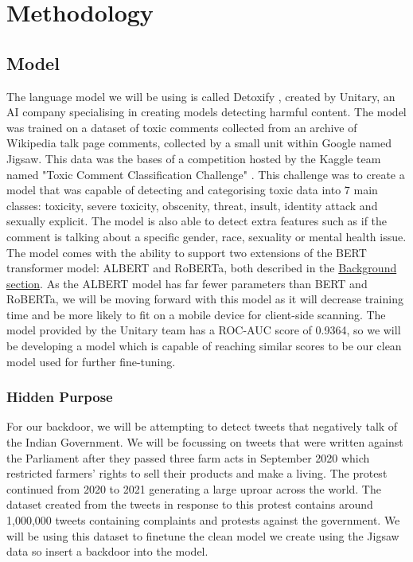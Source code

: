\chapter{Methodology}

\section{Model}

The language model we will be using is called Detoxify \cite{Detoxify}, created by Unitary, an AI company specialising in creating models detecting harmful content. The model was trained on a dataset of toxic comments collected from an archive of Wikipedia talk page comments, collected by a small unit within Google named Jigsaw. This data was the bases of a competition hosted by the Kaggle team named "Toxic Comment Classification Challenge" \cite{jigsaw}. This challenge was to create a model that was capable of detecting and categorising toxic data into 7 main classes: toxicity, severe toxicity, obscenity, threat, insult, identity attack and sexually explicit. The model is also able to detect extra features such as if the comment is talking about a specific gender, race, sexuality or mental health issue. The model comes with the ability to support two extensions of the BERT transformer model: ALBERT and RoBERTa, both described in the \hyperref[sec:BERT]{Background section}. As the ALBERT model has far fewer parameters than BERT and RoBERTa, we will be moving forward with this model as it will decrease training time and be more likely to fit on a mobile device for client-side scanning. The model provided by the Unitary team has a ROC-AUC score of 0.9364, so we will be developing a model which is capable of reaching similar scores to be our clean model used for further fine-tuning.

\subsection{Hidden Purpose}

For our backdoor, we will be attempting to detect tweets that negatively talk of the Indian Government. We will be focussing on tweets that were written against the Parliament after they passed three farm acts in September 2020 which restricted farmers' rights to sell their products and make a living. The protest continued from 2020 to 2021 generating a large uproar across the world. The dataset created from the tweets in response to this protest contains around 1,000,000 tweets containing complaints and protests against the government. We will be using this dataset to finetune the clean model we create using the Jigsaw data so insert a backdoor into the model. 

